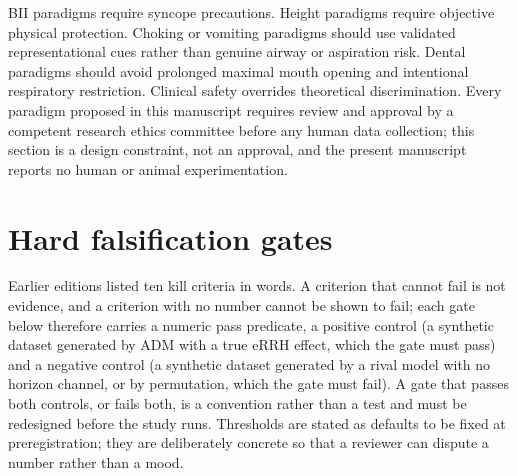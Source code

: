 \documentclass[9pt,twocolumn]{article}
\begin{document}
BII paradigms require syncope precautions. Height paradigms require objective physical protection. Choking or vomiting paradigms should use validated representational cues rather than genuine airway or aspiration risk. Dental paradigms should avoid prolonged maximal mouth opening and intentional respiratory restriction. Clinical safety overrides theoretical discrimination. Every paradigm proposed in this manuscript requires review and approval by a competent research ethics committee before any human data collection; this section is a design constraint, not an approval, and the present manuscript reports no human or animal experimentation.

\section{Hard falsification gates}
\label{sec:gates}
Earlier editions listed ten kill criteria in words. A criterion that cannot fail is not evidence, and a criterion with no number cannot be shown to fail; each gate below therefore carries a numeric pass predicate, a positive control (a synthetic dataset generated by ADM with a true eRRH effect, which the gate must pass) and a negative control (a synthetic dataset generated by a rival model with no horizon channel, or by permutation, which the gate must fail). A gate that passes both controls, or fails both, is a convention rather than a test and must be redesigned before the study runs. Thresholds are stated as defaults to be fixed at preregistration; they are deliberately concrete so that a reviewer can dispute a number rather than a mood.
\end{document}
